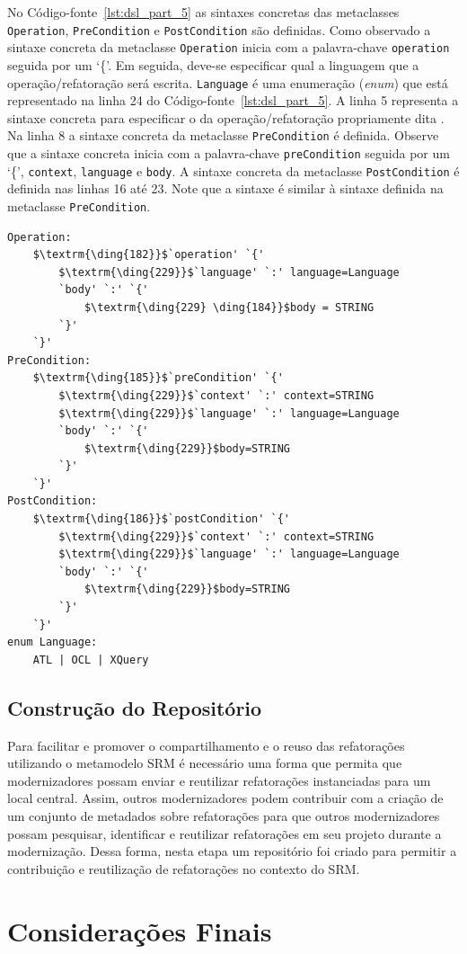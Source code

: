 No Código-fonte~\ref{lst:dsl_part_5} as sintaxes concretas das metaclasses \texttt{Operation}, \texttt{PreCondition} e \texttt{PostCondition} são definidas. Como observado a sintaxe concreta da metaclasse \texttt{Operation} inicia com a palavra-chave \texttt{operation} seguida por um `\{'. Em seguida, deve-se especificar qual a linguagem que a operação/refatoração será escrita. \texttt{Language} é uma enumeração (\textit{enum}) que está representado na linha 24 do Código-fonte~\ref{lst:dsl_part_5}. A linha 5 representa a sintaxe concreta para especificar o  da operação/refatoração propriamente dita . Na linha 8 a sintaxe concreta da metaclasse \texttt{PreCondition} é definida. Observe que a sintaxe concreta inicia com a palavra-chave \texttt{preCondition} seguida por um `\{', \texttt{context}, \texttt{language} e \texttt{body}. A sintaxe concreta da metaclasse \texttt{PostCondition} é definida nas linhas 16 até 23. Note que a sintaxe é similar à sintaxe definida na metaclasse \texttt{PreCondition}.
\begin{lstlisting}[language=Xtext, frame=single, basicstyle=\scriptsize, mathescape=true, label={lst:dsl_part_5}, caption={Gramática da DSL - parte 5}]
Operation: 
	$\textrm{\ding{182}}$`operation' `{'
		$\textrm{\ding{229}}$`language' `:' language=Language
		`body' `:' `{'
			$\textrm{\ding{229} \ding{184}}$body = STRING
		`}'
	`}'
PreCondition: 
	$\textrm{\ding{185}}$`preCondition' `{'
		$\textrm{\ding{229}}$`context' `:' context=STRING
		$\textrm{\ding{229}}$`language' `:' language=Language
		`body' `:' `{' 
			$\textrm{\ding{229}}$body=STRING	
		`}'
	`}'
PostCondition: 
	$\textrm{\ding{186}}$`postCondition' `{'
		$\textrm{\ding{229}}$`context' `:' context=STRING
		$\textrm{\ding{229}}$`language' `:' language=Language
		`body' `:' `{' 
			$\textrm{\ding{229}}$body=STRING	
		`}'
	`}'
enum Language: 
	ATL | OCL | XQuery
\end{lstlisting}


\subsection{Construção do Repositório}

Para facilitar e promover o compartilhamento e o reuso das refatorações utilizando o metamodelo SRM é necessário uma forma que permita que modernizadores possam enviar e reutilizar refatorações instanciadas para um local central. Assim, outros modernizadores podem contribuir com a criação de um conjunto de metadados sobre refatorações para que outros modernizadores possam pesquisar, identificar e reutilizar refatorações em seu projeto durante a modernização. Dessa forma, nesta etapa um repositório foi criado para permitir a contribuição e reutilização de refatorações no contexto do SRM. 




\section{Considerações Finais}
\label{sec:consideracoes_finais}

